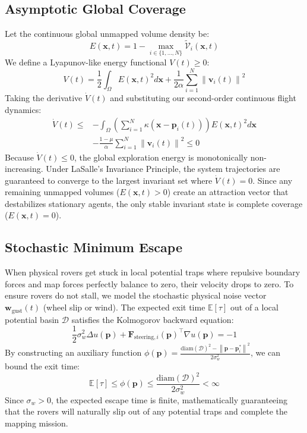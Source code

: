\documentclass[letterpaper, 10pt, conference]{IEEEtran}
\newcommand{\norm}[1]{\left\lVert#1\right\rVert}
\begin{document}
\subsection{Asymptotic Global Coverage}
Let the continuous global unmapped volume density be:
\begin{equation}
    E(\mathbf{x}, t) = 1 - \max_{i \in \{1,\dots,N\}} \tilde{\mathcal{V}}_i(\mathbf{x}, t)
\end{equation}
We define a Lyapunov-like energy functional $V(t) \geq 0$:
\begin{equation}
    V(t) = \frac{1}{2} \int_{\Omega} E(\mathbf{x}, t)^2 d\mathbf{x} + \frac{1}{2\alpha} \sum_{i=1}^N \norm{\mathbf{v}_i(t)}^2
\end{equation}
Taking the derivative $\dot{V}(t)$ and substituting our second-order continuous flight dynamics:
\begin{align}
    \dot{V}(t) \leq & -\int_{\Omega} \left( \sum_{i=1}^N \kappa(\mathbf{x} - \mathbf{p}_i(t)) \right) E(\mathbf{x}, t)^2 d\mathbf{x} \nonumber \\
    & - \frac{1 - \mu}{\alpha} \sum_{i=1}^N \norm{\mathbf{v}_i(t)}^2 \leq 0
\end{align}
Because $\dot{V}(t) \leq 0$, the global exploration energy is monotonically non-increasing. Under LaSalle's Invariance Principle, the system trajectories are guaranteed to converge to the largest invariant set where $\dot{V}(t) = 0$. Since any remaining unmapped volumes ($E(\mathbf{x}, t) > 0$) create an attraction vector that destabilizes stationary agents, the only stable invariant state is complete coverage ($E(\mathbf{x}, t) = 0$).

\subsection{Stochastic Minimum Escape}
When physical rovers get stuck in local potential traps where repulsive boundary forces and map forces perfectly balance to zero, their velocity drops to zero. To ensure rovers do not stall, we model the stochastic physical noise vector $\mathbf{w}_{\text{gust}}(t)$ (wheel slip or wind). The expected exit time $\mathbb{E}[\tau]$ out of a local potential basin $\mathcal{D}$ satisfies the Kolmogorov backward equation:
\begin{equation}
    \frac{1}{2}\sigma_w^2 \Delta u(\mathbf{p}) + \mathbf{F}_{\text{steering}, i}(\mathbf{p})^\top \nabla u(\mathbf{p}) = -1
\end{equation}
By constructing an auxiliary function $\phi(\mathbf{p}) = \frac{\text{diam}(\mathcal{D})^2 - \norm{\mathbf{p} - \mathbf{p}^*_i}^2}{2\sigma_w^2}$, we can bound the exit time:
\begin{equation}
    \mathbb{E}[\tau] \leq \phi(\mathbf{p}) \leq \frac{\text{diam}(\mathcal{D})^2}{2\sigma_w^2} < \infty
\end{equation}
Since $\sigma_w > 0$, the expected escape time is finite, mathematically guaranteeing that the rovers will naturally slip out of any potential traps and complete the mapping mission.
\end{document}
